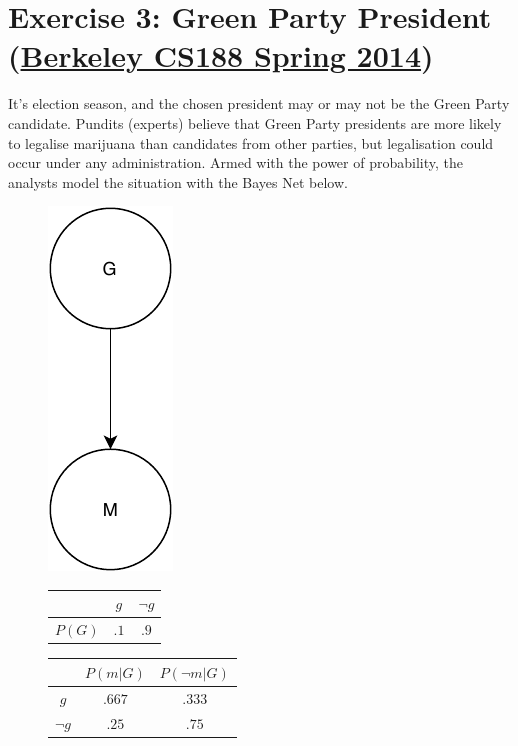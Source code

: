 \documentclass[9pt,a4paper]{extarticle}
\begin{document}
\section*{Exercise 3:  Green Party President (\href{http://ai.berkeley.edu/sections/section_7_solutions_sp14.pdf}{Berkeley CS188 Spring 2014})}
It’s election season, and the chosen president may or may not be the Green Party candidate. Pundits (experts) believe that Green Party presidents are more likely to legalise marijuana than candidates from other parties, but legalisation
could occur under any administration. Armed with the power of probability, the analysts model the situation with the Bayes Net below.
\begin{figure}[h]
\centering

\begin{minipage}{.45\textwidth}
\centering
\includegraphics[width=.2\textwidth]{figures/GPP_bnet.pdf}
\end{minipage}
\begin{minipage}{.45\textwidth}
\centering
\begin{tabular}{c|c|c|}
         & $g$ & $\lnot g$ \\ \hline
         $P(G)$ & $.1$ & $.9$  
\end{tabular}

\begin{tabular}{c|c|c|}
         & $P(m|G)$ & $P(\lnot m|G)$ \\ \hline
         $g$ & $.667$ & $.333$ \\
         $\lnot g$ & $.25$ & $.75$ 
\end{tabular}
\end{minipage}
\end{figure}
\end{document}
